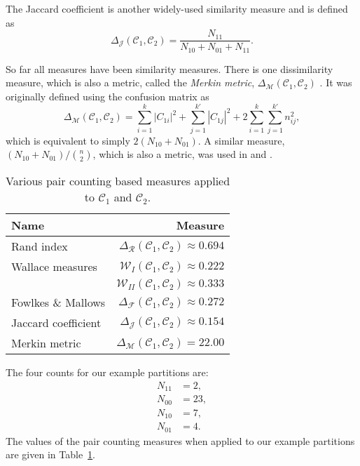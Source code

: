 \documentclass[a4paper]{report}
\newcommand{\clus}{\mathcal{C}}
\newcommand{\partcompare}[1]{\Delta_{\mathcal{#1}}(\clus_1,\clus_2)}
\begin{document}
The Jaccard coefficient is another widely-used similarity measure and is
defined as
\begin{equation*}
  \partcompare{J} = \frac{N_{11}}{N_{10}+N_{01}+N_{11}}.
\end{equation*}

So far all measures have been similarity measures.  There is one dissimilarity
measure, which is also a metric, called the \textit{Merkin metric},
$\partcompare{M}$ \citep{mirkin1996mathematical}.  It was originally defined
using the confusion matrix as
\begin{equation*}
  \partcompare{M} = \sum_{i=1}^{k} |C_{1i}|^2 +
                    \sum_{j=1}^{k'} |C_{1j}|^2 +
                    2\sum_{i=1}^{k}\sum_{j=1}^{k'} n_{ij}^2,
\end{equation*}
which is equivalent to simply $2(N_{10}+N_{01})$.  A similar measure,
$(N_{10}+N_{01})/\binom{n}{2}$, which is also a metric, was used in
\citet{mirkin1970measurement} and \citet{arabie1973multidimensional}.

\begin{table}
  \centering
  \begin{tabular}{lr}
    \toprule
    Name & Measure \\
    \midrule
    Rand index          & $\partcompare{R} \approx 0.694$ \\
    Wallace measures    & $\mathcal{W}_{I}(\clus_1,\clus_2) \approx 0.222$ \\
                        & $\mathcal{W}_{II}(\clus_1,\clus_2) \approx 0.333$ \\
    Fowlkes \& Mallows  & $\partcompare{F} \approx 0.272$ \\
    Jaccard coefficient & $\partcompare{J} \approx 0.154$ \\
    Merkin metric       & $\partcompare{M} = 22.00$ \\
    \bottomrule
  \end{tabular}
  \caption{Various pair counting based measures applied to $\clus_1$ and $\clus_2$.}
  \label{tab:pair-counting-comparison}
\end{table}

The four counts for our example partitions are:
\begin{align*}
  N_{11} &= 2,\\
  N_{00} &= 23,\\
  N_{10} &= 7,\\
  N_{01} &= 4.
\end{align*}
The values of the pair counting measures when applied to our example
partitions are given in Table~\ref{tab:pair-counting-comparison}.
\end{document}
